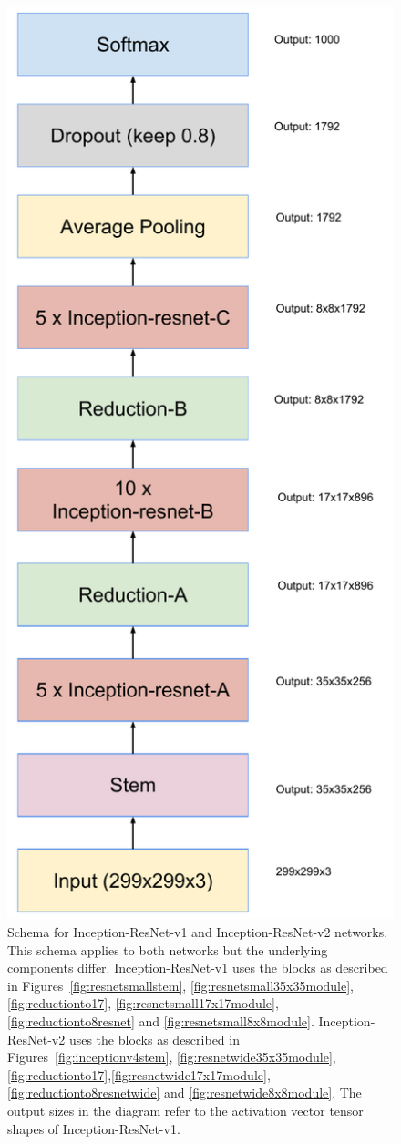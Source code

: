 \begin{figure}
\centering
\includegraphics[width=0.5\linewidth]{inceptionresnetsmallschema}
\caption{Schema for Inception-ResNet-v1 and Inception-ResNet-v2 networks.
  This schema applies to both networks but the underlying components differ.
  Inception-ResNet-v1 uses the blocks as described in Figures~\ref{fig:resnetsmallstem},
  \ref{fig:resnetsmall35x35module}, \ref{fig:reductionto17}, \ref{fig:resnetsmall17x17module},
  \ref{fig:reductionto8resnet} and \ref{fig:resnetsmall8x8module}.
  Inception-ResNet-v2 uses the blocks as described in Figures~\ref{fig:inceptionv4stem},
  \ref{fig:resnetwide35x35module}, \ref{fig:reductionto17},\ref{fig:resnetwide17x17module},
  \ref{fig:reductionto8resnetwide} and \ref{fig:resnetwide8x8module}.
  The output sizes in the diagram refer to the activation vector tensor shapes of
  Inception-ResNet-v1.
}
\label{fig:resnetsmallschema}
\end{figure}
\clearpage

